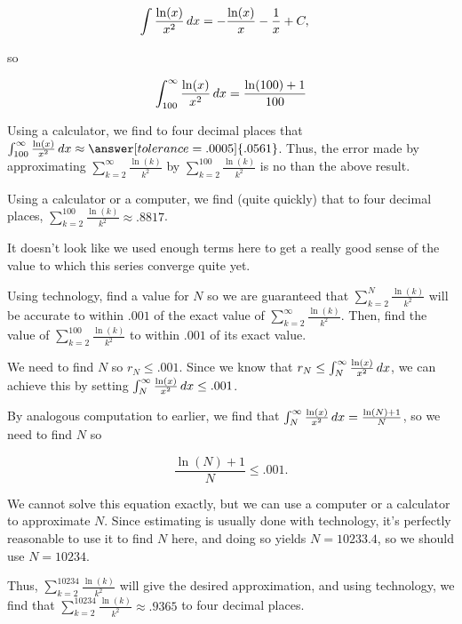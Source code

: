 \documentclass{ximera}
\begin{document}
\begin{example}
\begin{example}
\begin{explanation}
\begin{align*}
\int  \frac{\ln(x)}{x^2} \mathop{}\!d x &= -\frac{\ln(x)}{x} - \frac{1}{x} +C,
\end{align*}

so 

\[
\int_{100}^{\infty} \frac{\ln(x)}{x^2} \mathop{}\!d x =\frac{\ln(100)+1}{100} 
\]

Using a calculator, we find to four decimal places that $\int_{100}^{\infty} \frac{\ln(x)}{x^2} \d x  \approx \answer[tolerance=.0005]{.0561}$.  Thus, the error made by approximating $\sum_{k=2}^{\infty}  \frac{\ln(k)}{k^2}$ by $\sum_{k=2}^{100}  \frac{\ln(k)}{k^2}$ is no  than the above result.

Using a calculator or a computer, we find (quite quickly) that to four decimal places, $\sum_{k=2}^{100}  \frac{\ln(k)}{k^2} \approx .8817$.

It doesn't look like we used enough terms here to get a really good sense of the value to which this series converge quite yet.

\end{explanation}
\end{example}

\begin{example}
Using technology, find a value for $N$ so we are guaranteed that  $\sum_{k=2}^{N}  \frac{\ln(k)}{k^2}$ will be accurate to within $.001$ of the exact value of $\sum_{k=2}^{\infty}  \frac{\ln(k)}{k^2}$.  Then, find the value of $\sum_{k=2}^{100} \frac{\ln(k)}{k^2}$ to within $.001$ of its exact value.

\begin{explanation}
We need to find $N$ so $r_N \leq .001$.  Since we know that $r_N \leq \int_N^\infty  \frac{\ln(x)}{x^2} \mathop{}\!d x$, we can achieve this by setting $\int_N^\infty  \frac{\ln(x)}{x^2} \mathop{}\!d x \leq .001$.  

By analogous computation to earlier, we find that $\int_N^\infty  \frac{\ln(x)}{x^2} \mathop{}\!d x = \frac{\ln(N)+1}{N}$, so we need to find $N$ so

\[
\frac{\ln(N)+1}{N} \leq .001  .
\]

We cannot solve this equation exactly, but we can use a computer or a calculator to approximate $N$.  Since estimating is usually done with technology, it's perfectly reasonable to use it to find $N$ here, and doing so yields $N = 10233.4$, so we should use $N=10234$.

Thus, $\sum_{k=2}^{10234} \frac{\ln(k)}{k^2}$ will give the desired approximation, and using technology, we find that $\sum_{k=2}^{10234} \frac{\ln(k)}{k^2} \approx .9365$ to four decimal places.

\end{explanation}
\end{example}




\end{example}
\end{document}
